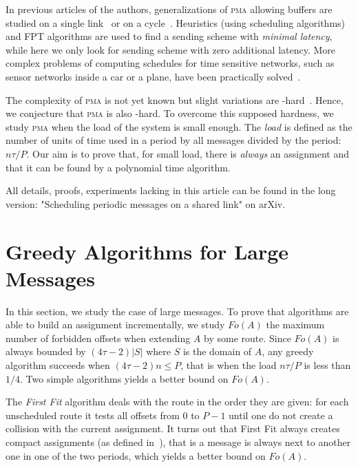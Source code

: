 \documentclass[10pt, conference, letterpaper]{algotel}
\newcommand\pma{\textsc{pma}\xspace}
\begin{document}
In previous articles of the authors, generalizations of \pma allowing buffers are studied on a single link~\cite{barth2018deterministic} or on a cycle~\cite{Guir1905:Deterministic}. Heuristics (using scheduling algorithms) and FPT algorithms are used to find a sending scheme with \emph{minimal latency}, while here we only look for sending scheme with zero additional latency. More complex problems of computing schedules for time sensitive networks, such as sensor networks inside a car or a plane, have been practically solved~\cite{nayak2017incremental,steiner2018traffic}. 

The complexity of \pma is not yet known but slight variations are \NP-hard~\cite{barth2018deterministic}.  Hence, we conjecture that \pma is also \NP-hard. To overcome this supposed hardness, we study \pma when the load of the system is small enough. The \emph{load} is defined as the number of units of time used in a period by all messages divided by the period: $n\tau /P$. Our aim is to prove that, for small load, there is \emph{always} an assignment and that it can be found by a polynomial time algorithm.

All details, proofs, experiments lacking in this article can be found in the long version: "Scheduling periodic messages on a shared link"
on arXiv.

\section{Greedy Algorithms for Large Messages} \label{sec:large}

In this section, we study the case of large messages. To prove that algorithms are able to build an assignment incrementally, we study $Fo(A)$ the maximum number of forbidden offsets when extending $A$ by some route.
Since $Fo(A)$ is always bounded by $(4 \tau -2)|S|$ where $S$ is the domain of $A$, any greedy algorithm succeeds when $(4 \tau -2)n \leq P$, that is when the load $n\tau /P$ is less than $1/4$. Two simple algorithms yields a better bound on $Fo(A)$.

The \emph{First Fit} algorithm deals with the route in the order they are given:  for each unscheduled route it tests all offsets from $0$ to $P-1$ until one do not create a collision with the current assignment. It turns out that First Fit always creates compact assignments (as defined in~\cite{barth2018deterministic}), that is a message is always next to another one in one of the two periods, which yields a better bound on $Fo(A)$.
\end{document}

